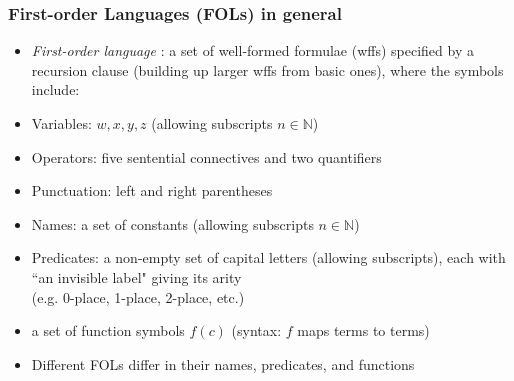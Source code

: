 \begin{frame}
\frametitle{First-order Languages (FOLs) in general}

\begin{itemize}[<+->]

\item \emph{First-order language }: a set of well-formed formulae (wffs) specified by a recursion clause (building up larger wffs from basic ones), where the symbols include:


\bi 


\item Variables: $w, x, y, z$ (allowing subscripts $n \in \mathbb{N}$) 
\item Operators: five sentential connectives and two quantifiers
\item Punctuation: left and right parentheses
\item \textcolor{OGlyallpink}{Names}: a set of constants (allowing subscripts $n \in\mathbb{N}$)
\item \textcolor{OGlyallpink}{Predicates}: a non-empty set of capital letters (allowing subscripts), each with ``an invisible label" giving its arity \\ (e.g. 0-place, 1-place, 2-place, etc.) 
\item a set of \textcolor{OGlyallpink}{function} symbols $f(c)$ (syntax: $f$ maps terms to terms) 
\ei 

\item \textcolor{OGlyallpink}{Different} FOLs differ in their names, predicates, and functions

\end{itemize}
\end{frame}

